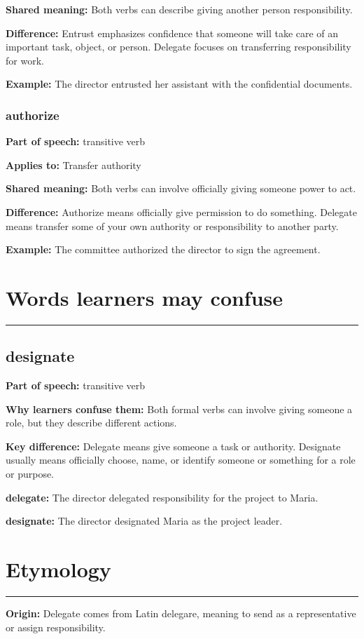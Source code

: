 \documentclass[11pt]{article}
\newcommand{\sectionrule}{\par\vspace{-0.5em}\noindent\textcolor{Accent}{\rule{\linewidth}{0.6pt}}\par}
\begin{document}
\textbf{Shared meaning:} Both verbs can describe giving another person responsibility.

\textbf{Difference:} Entrust emphasizes confidence that someone will take care of an important task, object, or person. Delegate focuses on transferring responsibility for work.

\textbf{Example:} The director entrusted her assistant with the confidential documents.

\subsubsection{authorize}
\textbf{Part of speech:} transitive verb

\textbf{Applies to:} Transfer authority

\textbf{Shared meaning:} Both verbs can involve officially giving someone power to act.

\textbf{Difference:} Authorize means officially give permission to do something. Delegate means transfer some of your own authority or responsibility to another party.

\textbf{Example:} The committee authorized the director to sign the agreement.

\section{Words learners may confuse}
\sectionrule
\subsection{designate}
\textbf{Part of speech:} transitive verb

\textbf{Why learners confuse them:} Both formal verbs can involve giving someone a role, but they describe different actions.

\textbf{Key difference:} Delegate means give someone a task or authority. Designate usually means officially choose, name, or identify someone or something for a role or purpose.

\textbf{delegate:} The director delegated responsibility for the project to Maria.

\textbf{designate:} The director designated Maria as the project leader.

\section{Etymology}
\sectionrule
\textbf{Origin:} Delegate comes from Latin delegare, meaning to send as a representative or assign responsibility.
\end{document}
